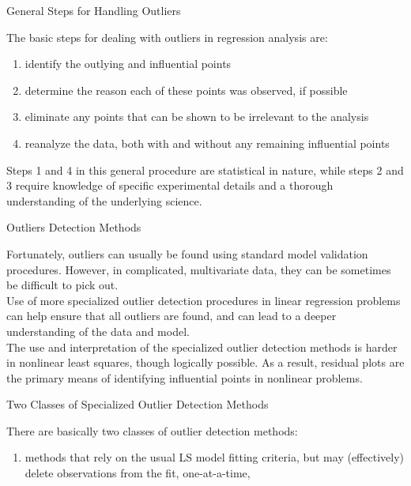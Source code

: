 {{\begin{center}
General Steps for Handling Outliers 
\end{center}
\vspace{0.5in}
The basic steps for dealing with outliers in regression analysis are:
\vspace{0.5in}
\begin{enumerate}
\item identify the outlying and influential points
\item determine the reason each of these points was observed, if possible
\item eliminate any points that can be shown to be irrelevant to the analysis
\item reanalyze the data, both with and without any remaining influential points
\end{enumerate}
\vspace{0.5in}
Steps 1 and 4 in this general procedure are statistical in nature, while steps
2 and 3 require knowledge of specific experimental details and a thorough understanding
of the underlying science.
\newpage
\begin{center}
Outliers Detection Methods
\end{center}
\vspace{0.5in}
Fortunately, outliers can usually be found using
standard model validation procedures.
However, in complicated, multivariate data, they can be 
sometimes be difficult to pick out. \\
\vspace{0.5in}
Use of more specialized outlier detection procedures 
in linear regression problems can help ensure that 
all outliers are found, and can lead to a deeper 
understanding of the data and model. \\
\vspace{0.5in}
The use and interpretation of the specialized outlier detection
methods is harder in nonlinear least squares, though logically
possible.  As a result, residual plots are the primary means of 
identifying influential points in nonlinear problems.
\newpage
\begin{center}
Two Classes of Specialized Outlier Detection Methods
\end{center}
\vspace{0.5in}
There are basically two classes of outlier detection methods: 
\vspace{0.5in}
\begin{enumerate}
\item methods that rely on the usual LS model fitting criteria,
but may (effectively) delete observations from the fit, one-at-a-time,

\end{enumerate}}}
